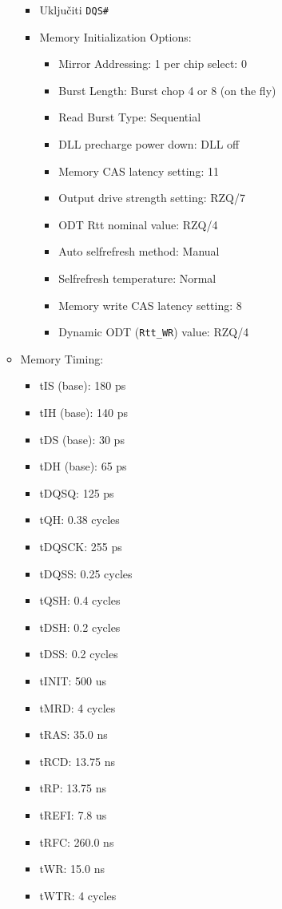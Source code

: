 \begin{enumerate}
\begin{itemize}
\begin{itemize}
\item		Uključiti \texttt{DQS\#}
\item		Memory Initialization Options:
\begin{itemize}
\item			Mirror Addressing: 1 per chip select: 0
\item			Burst Length: Burst chop 4 or 8 (on the fly)
\item			Read Burst Type: Sequential
\item			DLL precharge power down: DLL off
\item			Memory CAS latency setting: 11
\item			Output drive strength setting: RZQ/7
\item			ODT Rtt nominal value: RZQ/4
\item			Auto selfrefresh method: Manual
\item			Selfrefresh temperature: Normal
\item			Memory write CAS latency setting: 8
\item			Dynamic ODT (\texttt{Rtt\_WR}) value: RZQ/4
\end{itemize}
\end{itemize}
\item	Memory Timing:
\begin{itemize}
\item		tIS (base): 180 ps
\item		tIH (base): 140 ps
\item		tDS (base): 30 ps
\item		tDH (base): 65 ps
\item		tDQSQ: 125 ps
\item		tQH: 0.38 cycles
\item		tDQSCK: 255 ps
\item		tDQSS: 0.25 cycles
\item		tQSH: 0.4 cycles
\item		tDSH: 0.2 cycles
\item		tDSS: 0.2 cycles
\item		tINIT: 500 us
\item		tMRD: 4 cycles
\item		tRAS: 35.0 ns
\item		tRCD: 13.75 ns
\item		tRP: 13.75 ns
\item		tREFI: 7.8 us
\item		tRFC: 260.0 ns
\item		tWR: 15.0 ns
\item		tWTR: 4 cycles

\end{itemize}
\end{itemize}
\end{enumerate}
